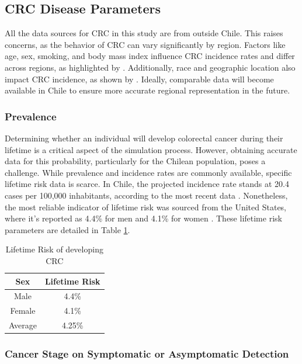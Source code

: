 \subsection{CRC Disease Parameters}

All the data sources for CRC in this study are from outside Chile. This raises concerns, as the behavior of CRC can vary significantly by region. Factors like age, sex, smoking, and body mass index influence CRC incidence rates and differ across regions, as highlighted by . Additionally, race and geographic location also impact CRC incidence, as shown by . Ideally, comparable data will become available in Chile to ensure more accurate regional representation in the future.

\subsubsection*{Prevalence}

Determining whether an individual will develop colorectal cancer during their lifetime is a critical aspect of the simulation process. However, obtaining accurate data for this probability, particularly for the Chilean population, poses a challenge. While prevalence and incidence rates are commonly available, specific lifetime risk data is scarce. In Chile, the projected incidence rate stands at 20.4 cases per 100,000 inhabitants, according to the most recent data \cite{rios_situacion_2020}. Nonetheless, the most reliable indicator of lifetime risk was sourced from the United States, where it's reported as 4.4\% for men and 4.1\% for women \cite{siegel_cancer_2020}. These lifetime risk parameters are detailed in Table \ref{table:crc_lifetime_risk}.

\begin{table}[H]
\caption{Lifetime Risk of developing CRC}
\centering
\begin{tabular}{|c|c|}
\hline
Sex & Lifetime Risk\\ \hline
Male & 4.4\%\\ \hline
Female & 4.1\%\\ \hline
Average & 4.25\%\\ \hline
\end{tabular}
\label{table:crc_lifetime_risk}
\end{table}

\subsubsection*{Cancer Stage on Symptomatic or Asymptomatic Detection}

